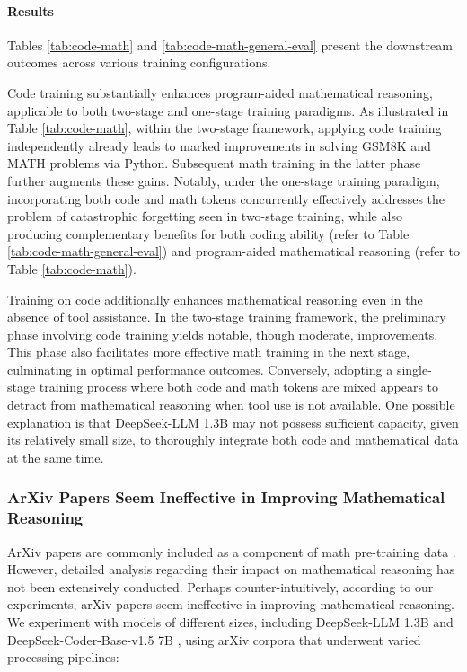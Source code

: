 \begin{itemize}[topsep=0pt]
\begin{itemize}[topsep=0pt]
\paragraph{Results}
Tables \ref{tab:code-math} and \ref{tab:code-math-general-eval} present the downstream outcomes across various training configurations.

Code training substantially enhances program-aided mathematical reasoning, applicable to both two-stage and one-stage training paradigms. As illustrated in Table \ref{tab:code-math}, within the two-stage framework, applying code training independently already leads to marked improvements in solving GSM8K and MATH problems via Python. Subsequent math training in the latter phase further augments these gains. Notably, under the one-stage training paradigm, incorporating both code and math tokens concurrently effectively addresses the problem of catastrophic forgetting seen in two-stage training, while also producing complementary benefits for both coding ability (refer to Table \ref{tab:code-math-general-eval}) and program-aided mathematical reasoning (refer to Table \ref{tab:code-math}).

Training on code additionally enhances mathematical reasoning even in the absence of tool assistance. In the two-stage training framework, the preliminary phase involving code training yields notable, though moderate, improvements. This phase also facilitates more effective math training in the next stage, culminating in optimal performance outcomes. Conversely, adopting a single-stage training process where both code and math tokens are mixed appears to detract from mathematical reasoning when tool use is not available. One possible explanation is that DeepSeek-LLM 1.3B may not possess sufficient capacity, given its relatively small size, to thoroughly integrate both code and mathematical data at the same time.

\subsubsection{ArXiv Papers Seem Ineffective in Improving Mathematical Reasoning}

ArXiv papers are commonly included as a component of math pre-training data \citep{minerva,gpt-f,llemma,mathpile}. However, detailed analysis regarding their impact on mathematical reasoning has not been extensively conducted. Perhaps counter-intuitively, according to our experiments, arXiv papers seem ineffective in improving mathematical reasoning. We experiment with models of different sizes, including DeepSeek-LLM 1.3B and DeepSeek-Coder-Base-v1.5 7B \citep{deepseek-coder}, using arXiv corpora that underwent varied processing pipelines:


\end{itemize}
\end{itemize}
